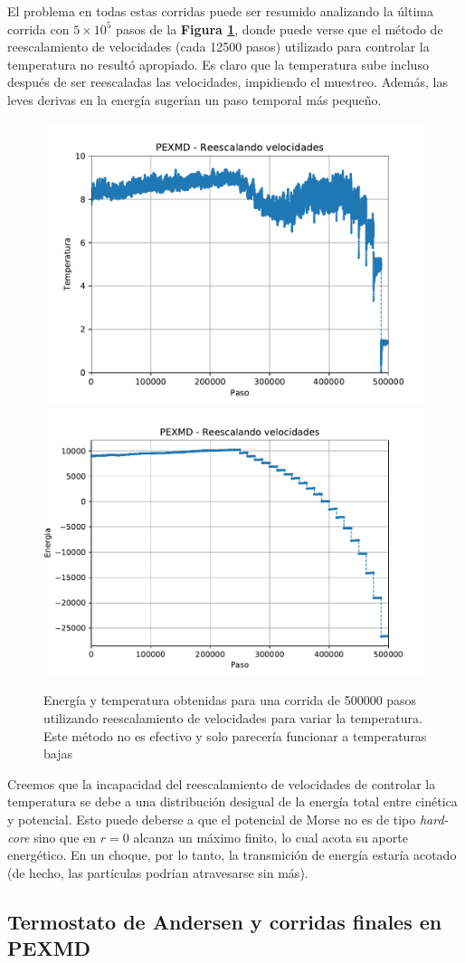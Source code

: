 \documentclass[twoside, 12pt]{article}
\begin{document}
El problema en todas estas corridas puede ser resumido analizando la última corrida con $5\times10^{5}$ pasos de la \textbf{Figura \ref{fig:sin_termo}}, donde puede verse que el método de reescalamiento de 
velocidades (cada 12500 pasos) utilizado para controlar la temperatura no resultó apropiado. Es claro que la temperatura sube incluso después de ser reescaladas las velocidades, impidiendo el muestreo. 
Además, las leves derivas en la energía sugerían un paso temporal más pequeño.

\begin{figure}[h]
	\centering
	\includegraphics[width=0.47\columnwidth]{tsintermo_pexmd.pdf}
	\includegraphics[width=0.49\columnwidth]{esintermo_pexmd.pdf}
	\caption{Energía y temperatura obtenidas para una corrida de 500000 pasos utilizando reescalamiento de velocidades para variar la temperatura. 
	Este método no es efectivo y solo parecería funcionar a temperaturas bajas}
	\label{fig:sin_termo}
\end{figure}

Creemos que la incapacidad del reescalamiento de velocidades de controlar la temperatura se debe a una distribución desigual de la energía total entre cinética y potencial.
Esto puede deberse a que el potencial de Morse no es de tipo \textit{hard-core} sino que en $r=0$ alcanza un máximo finito, lo cual acota su aporte energético.
En un choque, por lo tanto, la transmición de energía estaría acotado (de hecho, las partículas podrían atravesarse sin más).

\subsection{Termostato de Andersen y corridas finales en PEXMD}
\end{document}
